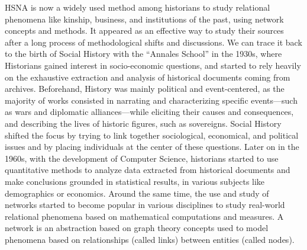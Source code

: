 HSNA is now a widely used method among historians to study relational phenomena like kinship, business, and institutions of the past, using network concepts and methods.
It appeared as an effective way to study their sources after a long process of methodological shifts and discussions\cite{cristofoliAuxSourcesGrands2008}.
We can trace it back to the birth of Social History with the ``Annales School'' in the 1930s, where Historians gained interest in socio-economic questions, and started to rely heavily on the exhaustive extraction and analysis of historical documents coming from archives\cite{blochApologiePourHistoire1949}.
Beforehand, History was mainly political and event-centered, as the majority of works consisted in narrating and characterizing specific events---such as wars and diplomatic alliances---while eliciting their causes and consequences, and describing the lives of historic figures, such as sovereigns.
Social History shifted the focus by trying to link together sociological, economical, and political issues and by placing individuals at the center of these questions\cite{prost2014}.
Later on in the 1960s, with the development of Computer Science, historians started to use quantitative methods to analyze data extracted from historical documents and make conclusions grounded in statistical results, in various subjects like demographics\cite{henryRegistresParoissiauxHistoire1956} or economics\cite{goldinCliometricsNobel1995}.
Around the same time, the use and study of networks started to become popular in various disciplines to study real-world relational phenomena based on mathematical computations and measures.
A network is an abstraction based on graph theory concepts used to model phenomena based on relationships (called links) between entities (called nodes).

